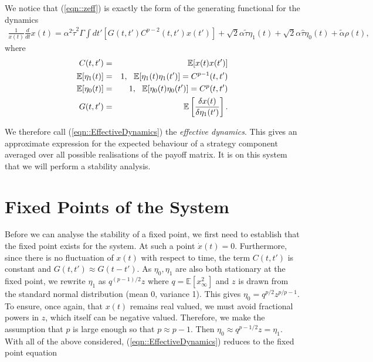 \documentclass{article}
\newcommand{\talpha}{\tilde{\alpha}}
\newcommand{\ttau}{\tilde{\tau}}
\newcommand{\htau}{\hat{\tau}}
\newcommand{\xfixed}{x_\infty}
\begin{document}
We notice that (\ref{eqn::zeff}) is exactly the form of the generating functional for the dynamics
%
\begin{equation}
    \label{eqn::EffectiveDynamics}
    \begin{split}
            \frac{1}{x(t)} \frac{d}{dt} x(t) = \alpha^2 \ttau^2 \Gamma \int dt' \left [G(t, t')C^{p - 2}(t, t') x(t') \right ] + \sqrt{2} \alpha \ttau \eta_1(t) + \sqrt{2} \alpha \htau \eta_0(t) + \talpha \rho(t), 
    \end{split}
\end{equation}
%
where
%
\begin{eqnarray*}
        C(t, t') & = & \mathbb{E}[x(t) x(t')] \\
        \mathbb{E}[\eta_1(t)] & = & 1, \text{ \space } \mathbb{E}[\eta_1(t) \eta_1(t')]  =  C^{p-1}(t, t') \\
        \mathbb{E}[\eta_0(t)] & = & 1, \text{ \space } \mathbb{E}[\eta_0(t) \eta_0(t')] = C^{p}(t, t') \\
        G(t, t') & = & \mathbb{E}\left [ \frac{\delta x(t)}{ \delta \eta_1(t')} \right].
\end{eqnarray*}

We therefore call (\ref{eqn::EffectiveDynamics}) the \textit{effective dynamics}. This gives an approximate expression for the expected behaviour of a strategy component averaged over all possible realisations of the payoff matrix. It is on this system that we will perform a stability analysis.

\section{Fixed Points of the System}

Before we can analyse the stability of a fixed point, we first need to establish that the fixed point exists for the system. At such a point $\dot{x}(t) = 0$. Furthermore, since there is no fluctuation of $x(t)$ with respect to time, the term $C(t, t')$ is constant and $G(t, t') \approx G(t - t')$. As $\eta_0, \eta_1$ are also both stationary at the fixed point, we rewrite $\eta_1$ as $q^{(p-1)/2}z$ where $q = \mathbb{E}[\xfixed^2]$ and $z$ is drawn from the standard normal distribution (mean 0, variance 1). This gives $\eta_0 = q^{p/2}z^{p/p-1}$. To ensure, once again, that $x(t)$ remains real valued, we must avoid fractional powers in $z$, which itself can be negative valued. Therefore, we make the assumption that $p$ is large enough so that $p \approx p-1$. Then $\eta_0 \approx q^{p-1/2}z = \eta_1$. With all of the above considered, (\ref{eqn::EffectiveDynamics}) reduces to the fixed point equation
\end{document}
